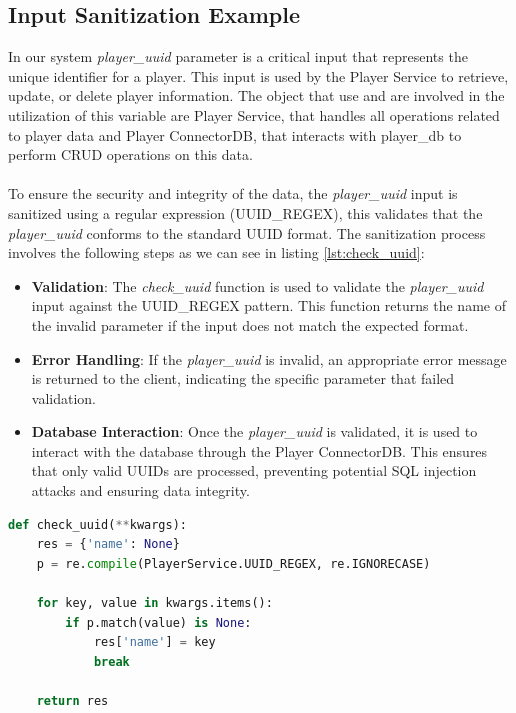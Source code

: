 \documentclass{article}
\begin{document}
\subsection{Input Sanitization Example}
In our system \emph{player\_uuid} parameter is a critical input that represents the unique identifier for a player. This input is used by the Player Service to retrieve, update, or delete player information. 
The object that use and are involved in the utilization of this variable are Player Service, that handles all operations related to player data and Player ConnectorDB, that interacts with player\_db to perform CRUD operations on this data. \\ \\
To ensure the security and integrity of the data, the \emph{player\_uuid} input is sanitized using a regular expression (UUID\_REGEX), this validates that the \emph{player\_uuid} conforms to the standard UUID format. The sanitization process involves the following steps as we can see in listing \ref{lst:check_uuid}:
\begin{itemize}
    \item \textbf{Validation}: The \emph{check\_uuid} function is used to validate the \emph{player\_uuid} input against the UUID\_REGEX pattern. This function returns the name of the invalid parameter if the input does not match the expected format.
    \item \textbf{Error Handling}:  If the \emph{player\_uuid} is invalid, an appropriate error message is returned to the client, indicating the specific parameter that failed validation.
    \item \textbf{Database Interaction}: Once the \emph{player\_uuid} is validated, it is used to interact with the database through the Player ConnectorDB. This ensures that only valid UUIDs are processed, preventing potential SQL injection attacks and ensuring data integrity.
\end{itemize}

\begin{lstlisting}[language=Python, caption={Sanitization example}, label={lst:check_uuid}]
def check_uuid(**kwargs):
    res = {'name': None}
    p = re.compile(PlayerService.UUID_REGEX, re.IGNORECASE)

    for key, value in kwargs.items():
        if p.match(value) is None:
            res['name'] = key
            break

    return res
\end{lstlisting}
\end{document}
